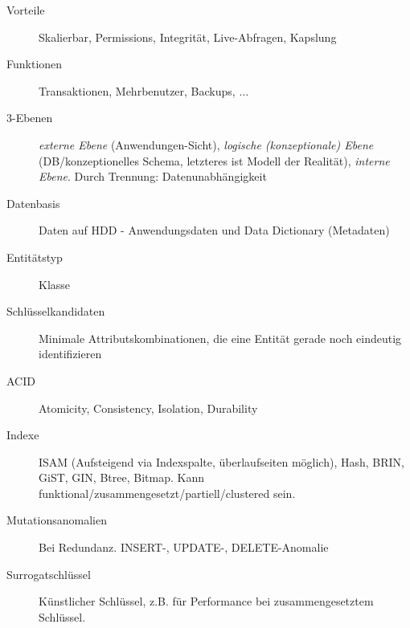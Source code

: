 \begin{multicols*}{3}
\begin{description}
\item[Vorteile]{Skalierbar, Permissions, Integrität, Live-Abfragen, Kapslung}
\item[Funktionen]{Transaktionen, Mehrbenutzer, Backups, $\ldots$}
\item[3-Ebenen]{\emph{externe Ebene} (Anwendungen-Sicht), \emph{logische (konzeptionale) Ebene}
    (DB/konzeptionelles Schema, letzteres ist Modell der Realität), \emph{interne
    Ebene}. Durch Trennung: Datenunabhängigkeit}
\item[Datenbasis]{Daten auf HDD - Anwendungsdaten und Data Dictionary (Metadaten)}
\item[Entitätstyp]{Klasse}
\item[Schlüsselkandidaten]{Minimale Attributskombinationen, die eine Entität
    gerade noch eindeutig identifizieren}
\item[ACID]{Atomicity, Consistency, Isolation, Durability}
\item[Indexe]{ISAM (Aufsteigend via Indexspalte, überlaufseiten möglich), Hash, BRIN, GiST, GIN, Btree, Bitmap. Kann funktional/zusammengesetzt/partiell/clustered sein.}
\item[Mutationsanomalien]{Bei Redundanz. INSERT-, UPDATE-, DELETE-Anomalie}
\item[Surrogatschlüssel]{Künstlicher Schlüssel, z.B. für Performance bei
    zusammengesetztem Schlüssel}.
\end{description}


\end{multicols*}

